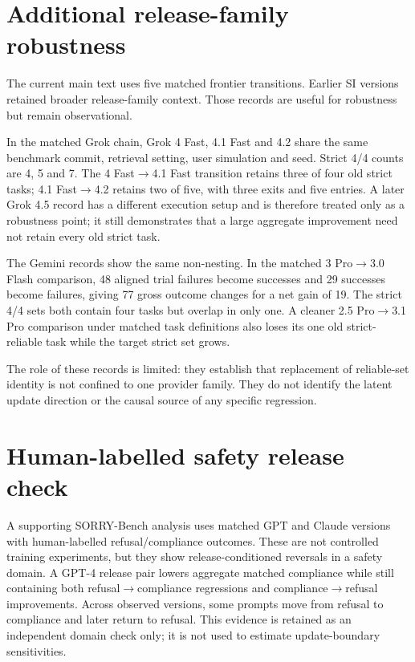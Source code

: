 \documentclass[11pt,letterpaper]{article}
\theoremstyle{plain}
\newcommand{\1}{\mathbf 1}
\begin{document}
\section{Additional release-family robustness}
The current main text uses five matched frontier transitions. Earlier SI versions retained broader release-family context. Those records are useful for robustness but remain observational.

In the matched Grok chain, Grok 4 Fast, 4.1 Fast and 4.2 share the same benchmark commit, retrieval setting, user simulation and seed. Strict 4/4 counts are 4, 5 and 7. The 4 Fast$\to$4.1 Fast transition retains three of four old strict tasks; 4.1 Fast$\to$4.2 retains two of five, with three exits and five entries. A later Grok 4.5 record has a different execution setup and is therefore treated only as a robustness point; it still demonstrates that a large aggregate improvement need not retain every old strict task.

The Gemini records show the same non-nesting. In the matched 3 Pro$\to$3.0 Flash comparison, 48 aligned trial failures become successes and 29 successes become failures, giving 77 gross outcome changes for a net gain of 19. The strict 4/4 sets both contain four tasks but overlap in only one. A cleaner 2.5 Pro$\to$3.1 Pro comparison under matched task definitions also loses its one old strict-reliable task while the target strict set grows.

The role of these records is limited: they establish that replacement of reliable-set identity is not confined to one provider family. They do not identify the latent update direction or the causal source of any specific regression.

\section{Human-labelled safety release check}
\sloppy A supporting SORRY-Bench analysis uses matched GPT and Claude versions with human-labelled refusal/compliance outcomes. These are not controlled training experiments, but they show release-conditioned reversals in a safety domain. A GPT-4 release pair lowers aggregate matched compliance while still containing both refusal$\to$compliance regressions and compliance$\to$refusal improvements. Across observed versions, some prompts move from refusal to compliance and later return to refusal. This evidence is retained as an independent domain check only; it is not used to estimate update-boundary sensitivities.\fussy
\end{document}

